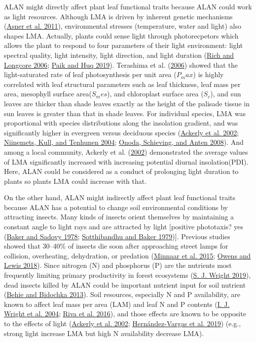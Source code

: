 \documentclass[
  letterpaper,
  DIV=11,
  numbers=noendperiod]{scrartcl}
\begin{document}
ALAN might directly affect plant leaf functional traits because ALAN
could work as light resources. Although LMA is driven by inherent
genetic mechanisms (\protect\hyperlink{ref-Asner2011}{Asner et al.
2011}), environmental stresses (temperature, water and light) also
shapes LMA. Actually, plants could sense light through photorecpetors
which allows the plant to respond to four parameters of their light
environment: light spectral quality, light intensity, light direction,
and light duration (\protect\hyperlink{ref-Rich2006}{Rich and Longcore
2006}; \protect\hyperlink{ref-Paik2019}{Paik and Huq 2019}). Terashima
et al. (\protect\hyperlink{ref-Terashima2006}{2006}) showed that the
light-saturated rate of leaf photosynthesis per unit area (\(P_max\)) is
highly correlated with leaf structural parameters such as leaf
thickness, leaf mass per area, mesophyll surface area(\(S_mes\)), and
chloroplast surface area (\(S_c\)), and sun leaves are thicker than
shade leaves exactly as the height of the palisade tissue in sun leaves
is greater than that in shade leaves. For individual species, LMA was
proportional with species distributions along the insolation gradient,
and was significantly higher in evergreen versus deciduous species
(\protect\hyperlink{ref-Ackerly2002}{Ackerly et al. 2002};
\protect\hyperlink{ref-Niinemets2004}{Niinemets, Kull, and Tenhunen
2004}; \protect\hyperlink{ref-Onoda2008}{Onoda, Schieving, and Anten
2008}). And among a local community, Ackerly et al.
(\protect\hyperlink{ref-Ackerly2002}{2002}) demonstrated the average
values of LMA significantly increased with increasing potential diurnal
insolation(PDI). Here, ALAN could be considered as a conduct of
prolonging light duration to plants so plants LMA could increase with
that.

On the other hand, ALAN might indirectly affect plant leaf functional
traits because ALAN has a potential to change soil environmental
conditions by attracting insects. Many kinds of insects orient
themselves by maintaining a constant angle to light rays and are
attracted by light {[}positive phototaxis? yes
(\protect\hyperlink{ref-Baker1978}{Baker and Sadovy 1978};
\protect\hyperlink{ref-Sotthibandhu1979}{Sotthibandhu and Baker
1979}){]}. Previous studies showed that 30--40\% of insects die soon
after approaching street lamps for collision, overheating, dehydration,
or predation (\protect\hyperlink{ref-Minnaar2015}{Minnaar et al. 2015};
\protect\hyperlink{ref-Owens2018}{Owens and Lewis 2018}). Since nitrogen
(N) and phosphorus (P) are the nutrients most frequently limiting
primary productivity in forest ecosystems
(\protect\hyperlink{ref-Wright2019}{S. J. Wright 2019}), dead insects
killed by ALAN could be important nutrient input for soil nutrient
(\protect\hyperlink{ref-Behie2013}{Behie and Bidochka 2013}). Soil
resources, especially N and P availability, are known to affect leaf
mass per area (LAM) and leaf N and P contents
(\protect\hyperlink{ref-Wright2004}{I. J. Wright et al. 2004};
\protect\hyperlink{ref-Riva2016}{Riva et al. 2016}), and those effects
are known to be opposite to the effects of light
(\protect\hyperlink{ref-Ackerly2002}{Ackerly et al. 2002};
\protect\hyperlink{ref-Hernandez-Vargas2019}{Hernández-Vargas et al.
2019}) (e.g., strong light increase LMA but high N availability decrease
LMA).
\end{document}
